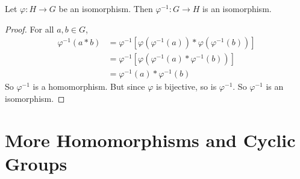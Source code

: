 \documentclass{article}
\begin{document}
	\begin{proposition}
		Let $\varphi: H \to G$ be an isomorphism. Then $\varphi^{-1}: G \to H$ is an isomorphism.
	\end{proposition}
	\begin{proof}
		For all $a, b \in G$,
		\begin{align*}
			\varphi^{-1}(a \ast b) &= \varphi^{-1}\left[ \varphi(\varphi^{-1}(a)) \ast \varphi(\varphi^{-1}(b)) \right] \\
			&= \varphi^{-1}\left[ \varphi(\varphi^{-1}(a) \ast \varphi^{-1}(b)) \right] \\
			&= \varphi^{-1}(a) \ast \varphi^{-1}(b)
		\end{align*}
		So $\varphi^{-1}$ is a homomorphism. But since $\varphi$ is bijective, so is $\varphi^{-1}$. So $\varphi^{-1}$ is an isomorphism.
	\end{proof}

	\section{More Homomorphisms and Cyclic Groups}
\end{document}

